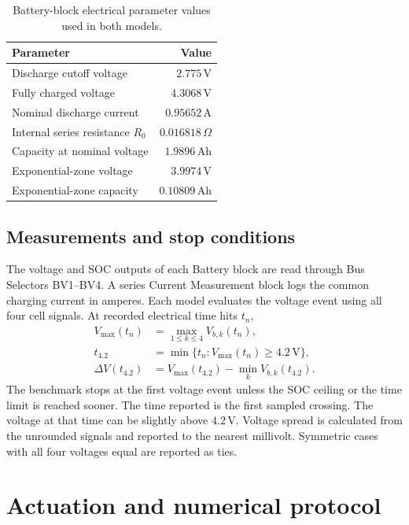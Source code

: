 \documentclass[a4paper,10pt,twocolumn]{article}
\begin{document}
\begin{table}[htbp]
\centering\small
\caption{Battery-block electrical parameter values used in both models.}
\label{tab:battery}
\begin{tabular}{@{}lr@{}}
\toprule
Parameter & Value\\
\midrule
Discharge cutoff voltage & $2.775\,\mathrm{V}$\\
Fully charged voltage & $4.3068\,\mathrm{V}$\\
Nominal discharge current & $0.95652\,\mathrm{A}$\\
Internal series resistance $R_0$ & $0.016818\,\Omega$\\
Capacity at nominal voltage & $1.9896\,\mathrm{Ah}$\\
Exponential-zone voltage & $3.9974\,\mathrm{V}$\\
Exponential-zone capacity & $0.10809\,\mathrm{Ah}$\\
\bottomrule
\end{tabular}
\end{table}

\subsection{Measurements and stop conditions}
The voltage and SOC outputs of each Battery block are read through Bus Selectors BV1--BV4. A series Current Measurement block logs the common charging current in amperes. Each model evaluates the voltage event using all four cell signals. At recorded electrical time hits $t_n$,
\begin{equation}
\begin{aligned}
V_{\max}(t_n)&=\max_{1\le k\le4} V_{b,k}(t_n),\\
t_{4.2}&=\min\{t_n:V_{\max}(t_n)\ge4.2\,\mathrm{V}\},\\
\Delta V(t_{4.2})&=V_{\max}(t_{4.2})-\min_k V_{b,k}(t_{4.2}).
\end{aligned}
\label{eq:events}
\end{equation}
The benchmark stops at the first voltage event unless the SOC ceiling or the time limit is reached sooner. The time reported is the first sampled crossing. The voltage at that time can be slightly above $4.2\,\mathrm{V}$. Voltage spread is calculated from the unrounded signals and reported to the nearest millivolt. Symmetric cases with all four voltages equal are reported as ties.

\section{Actuation and numerical protocol}
\label{sec:protocol}
\end{document}
